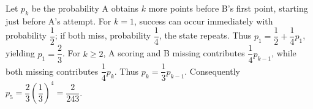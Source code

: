 Let $ p_k $ be the probability A obtains $ k $ more points before B's first point, starting just before A's attempt. For $ k=1 $, success can occur immediately with probability $\dfrac{1}{2}$; if both miss, probability $\dfrac{1}{4}$, the state repeats. Thus $ p_1=\dfrac{1}{2}+\dfrac{1}{4}p_1 $, yielding $ p_1=\dfrac{2}{3}$. For $ k\ge2 $, A scoring and B missing contributes $\dfrac{1}{4}p_{k-1}$, while both missing contributes $\dfrac{1}{4}p_k $. Thus $ p_k=\dfrac{1}{3}p_{k-1}$. Consequently $ p_5=\dfrac{2}{3}(\dfrac{1}{3})^4=\boxed{\dfrac{2}{243}}$.

